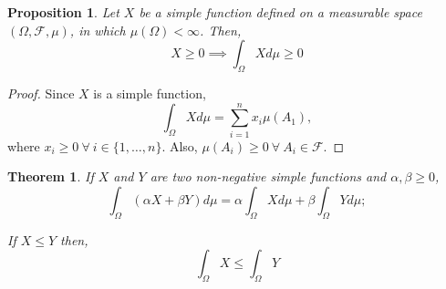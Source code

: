 \documentclass[11pt]{report}
\newtheorem{theorem}{Theorem}
\newtheorem{proposition}{Proposition}[chapter]
\newcommand{\salgF}{\mathscr{F}}
\begin{document}
\begin{proposition} \label{prop:nnlmsf}
	Let $X$ be a simple function defined on a measurable space $(\Omega, \salgF, \mu)$, in which $\mu(\Omega) < \infty$. Then,
	\begin{equation}
		X \geq 0 \implies \int_\Omega X d\mu \geq 0
	\end{equation}
\end{proposition}

\begin{proof}
	Since $X$ is a simple function,
	\[
	\int_\Omega X d\mu = \sum_{i=1}^n x_i \mu(A_1),
	\]
	where $x_i \geq 0 \ \forall \ i \in \{1, \ldots, n\}$. Also, $\mu(A_i) \geq 0 \ \forall \ A_i \in \salgF$.
\end{proof}

\begin{theorem}
	If $X$ and $Y$ are two non-negative simple functions and $\alpha, \beta \geq 0$,
	\begin{equation}
		\int_\Omega (\alpha X + \beta Y) d\mu = \alpha\int_\Omega X d\mu + \beta\int_\Omega Y d\mu;
	\end{equation}
	
	If $X \leq Y$ then,
	\begin{equation}
		\int_\Omega X \leq \int_\Omega Y
	\end{equation} 
\end{theorem}
\end{document}
